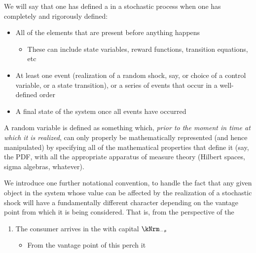 \documentclass[\econtexRoot/BufferStockTheory]{subfiles}
\begin{document}
We will say that one has defined a {\stge} in a stochastic process when one has completely and rigorously defined:
\begin{itemize}
\item All of the elements that are present before anything happens
  \begin{itemize}
  \item These can include state variables, reward functions, transition equations, etc
  \end{itemize}
\item At least one event (realization of a random shock, say, or choice of a control variable, or a state transition), or a series of events that occur in a well-defined order
  \item A final state of the system once all events have occurred
\end{itemize}

A random variable is defined as something which, \textit{prior to the moment in time at which it is realized}, can only properly be mathematically represented (and hence manipulated) by specifying all of the mathematical properties that define it  (say, the PDF, with all the appropriate apparatus of measure theory (Hilbert spaces, sigma algebras, whatever).


We introduce one further notational convention, to handle the fact that any given object in the system whose value can be affected by the realization of a stochastic shock will have a fundamentally different character depending on the vantage point from which it is being considered.  That is, from the perspective of the 

\begin{enumerate}
\item The consumer arrives in the {\stge} with capital $\kNrm_{-\tnow}$
  \begin{itemize}
    \item From the vantage point of this perch it 
    \end{itemize}
  \end{enumerate}
\end{document}
